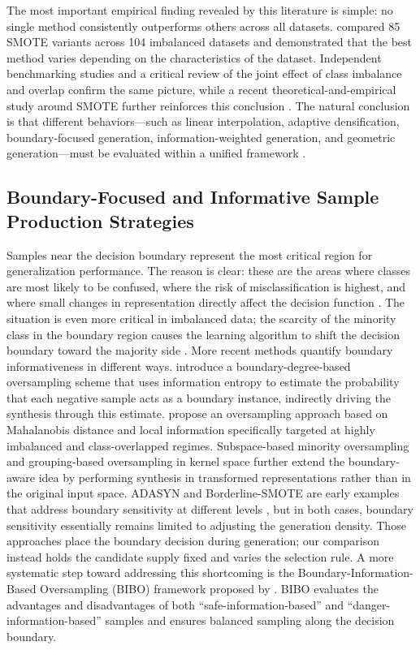\documentclass[pdflatex]{sn-jnl}
\begin{document}
The most important empirical finding revealed by this literature is simple: no single method consistently outperforms others across all datasets. \cite{ref15} compared 85 SMOTE variants across 104 imbalanced datasets and demonstrated that the best method varies depending on the characteristics of the dataset. Independent benchmarking studies \cite{ref17} and a critical review of the joint effect of class imbalance and overlap \cite{ref16} confirm the same picture, while a recent theoretical-and-empirical study around SMOTE further reinforces this conclusion \cite{ref08}. The natural conclusion is that different behaviors---such as linear interpolation, adaptive densification, boundary-focused generation, information-weighted generation, and geometric generation---must be evaluated within a unified framework \cite{ref02} \cite{ref06}.

\subsection{Boundary-Focused and Informative Sample Production Strategies}

Samples near the decision boundary represent the most critical region for generalization performance. The reason is clear: these are the areas where classes are most likely to be confused, where the risk of misclassification is highest, and where small changes in representation directly affect the decision function \cite{ref13} \cite{ref14}. The situation is even more critical in imbalanced data; the scarcity of the minority class in the boundary region causes the learning algorithm to shift the decision boundary toward the majority side \cite{ref11}. More recent methods quantify boundary informativeness in different ways. \cite{ref29} introduce a boundary-degree-based oversampling scheme that uses information entropy to estimate the probability that each negative sample acts as a boundary instance, indirectly driving the synthesis through this estimate. \cite{ref30} propose an oversampling approach based on Mahalanobis distance and local information specifically targeted at highly imbalanced and class-overlapped regimes. Subspace-based minority oversampling \cite{ref27} and grouping-based oversampling in kernel space \cite{ref31} further extend the boundary-aware idea by performing synthesis in transformed representations rather than in the original input space. ADASYN and Borderline-SMOTE are early examples that address boundary sensitivity at different levels \cite{ref13} \cite{ref18}, but in both cases, boundary sensitivity essentially remains limited to adjusting the generation density. Those approaches place the boundary decision during generation; our comparison instead holds the candidate supply fixed and varies the selection rule. A more systematic step toward addressing this shortcoming is the Boundary-Information-Based Oversampling (BIBO) framework proposed by \cite{ref10}. BIBO evaluates the advantages and disadvantages of both ``safe-information-based'' and ``danger-information-based'' samples and ensures balanced sampling along the decision boundary.
\end{document}
